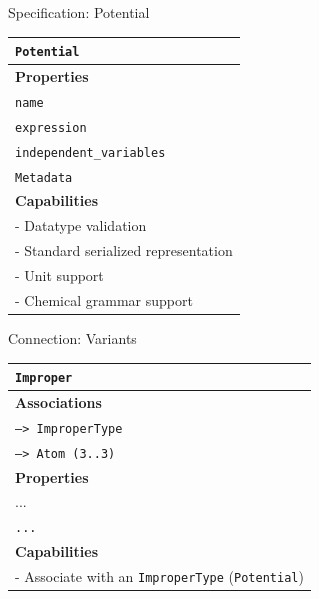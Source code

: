 \documentclass[xcolor=table]{beamer}
\begin{document}
\begin{frame}{Specification: Potential}
\begin{table}[ht]
    \centering
    \begin{tabular}{|l|}
         \hline
         \rowcolor{gray!50}
         \texttt{Potential}  \\
         \hline
         \textbf{Properties}\\
         \hline
         \texttt{name} \\
         \texttt{expression} \\
         \texttt{independent\_variables}\\
         \texttt{Metadata}\\
         \hline
         \textbf{Capabilities}\\
         \hline
         - Datatype validation \\
         - Standard serialized representation \\
         - Unit support \\
         - Chemical grammar support \\
        \hline
    \end{tabular}
    \label{tab:PotSpec}
\end{table}

\end{frame}

\begin{frame}{Connection: Variants}
\begin{table}[ht]
    \centering
    \label{tab:ExampleConnections}

 \begin{tabular}{|l|}

         \hline
         \rowcolor{gray!50}
         \texttt{Improper}  \\
         \hline
         \textbf{Associations} \\
         \hline
         \texttt{--> ImproperType}\\
         \texttt{--> Atom (3..3)}\\
         \textbf{Properties}\\
         \hline
            ...\\
             \texttt{...}\\
         \hline
         \textbf{Capabilities}\\
         \hline
         - Associate with an \texttt{ImproperType} (\texttt{Potential})\\
        \hline
    \end{tabular}
\end{table}

\end{frame}
\end{document}
